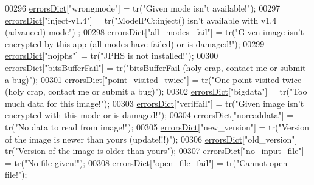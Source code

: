 \begin{DoxyCode}
00296     \hyperlink{class_view_p_c_aaf7f058e5589d65fec72a21abfd5629b}{errorsDict}[\textcolor{stringliteral}{"wrongmode"}] = tr(\textcolor{stringliteral}{"Given mode isn't available!"});
00297     \hyperlink{class_view_p_c_aaf7f058e5589d65fec72a21abfd5629b}{errorsDict}[\textcolor{stringliteral}{"inject-v1.4"}] = tr(\textcolor{stringliteral}{"ModelPC::inject() isn't available with v1.4 (advanced) mode"})
      ;
00298     \hyperlink{class_view_p_c_aaf7f058e5589d65fec72a21abfd5629b}{errorsDict}[\textcolor{stringliteral}{"all\_modes\_fail"}] = tr(\textcolor{stringliteral}{"Given image isn't encrypted by this app (all modes have
       failed) or is damaged!"});
00299     \hyperlink{class_view_p_c_aaf7f058e5589d65fec72a21abfd5629b}{errorsDict}[\textcolor{stringliteral}{"nojphs"}] = tr(\textcolor{stringliteral}{"JPHS is not installed!"});
00300     \hyperlink{class_view_p_c_aaf7f058e5589d65fec72a21abfd5629b}{errorsDict}[\textcolor{stringliteral}{"bitsBufferFail"}] = tr(\textcolor{stringliteral}{"bitsBufferFail (holy crap, contact me or submit a bug)"});
00301     \hyperlink{class_view_p_c_aaf7f058e5589d65fec72a21abfd5629b}{errorsDict}[\textcolor{stringliteral}{"point\_visited\_twice"}] = tr(\textcolor{stringliteral}{"One point visited twice (holy crap, contact me or
       submit a bug)"});
00302     \hyperlink{class_view_p_c_aaf7f058e5589d65fec72a21abfd5629b}{errorsDict}[\textcolor{stringliteral}{"bigdata"}] = tr(\textcolor{stringliteral}{"Too much data for this image!"});
00303     \hyperlink{class_view_p_c_aaf7f058e5589d65fec72a21abfd5629b}{errorsDict}[\textcolor{stringliteral}{"veriffail"}] = tr(\textcolor{stringliteral}{"Given image isn't encrypted with this mode or is damaged!"});
00304     \hyperlink{class_view_p_c_aaf7f058e5589d65fec72a21abfd5629b}{errorsDict}[\textcolor{stringliteral}{"noreaddata"}] = tr(\textcolor{stringliteral}{"No data to read from image!"});
00305     \hyperlink{class_view_p_c_aaf7f058e5589d65fec72a21abfd5629b}{errorsDict}[\textcolor{stringliteral}{"new\_version"}] = tr(\textcolor{stringliteral}{"Version of the image is newer than yours (update!!!)"});
00306     \hyperlink{class_view_p_c_aaf7f058e5589d65fec72a21abfd5629b}{errorsDict}[\textcolor{stringliteral}{"old\_version"}] = tr(\textcolor{stringliteral}{"Version of the image is older than yours"});
00307     \hyperlink{class_view_p_c_aaf7f058e5589d65fec72a21abfd5629b}{errorsDict}[\textcolor{stringliteral}{"no\_input\_file"}] = tr(\textcolor{stringliteral}{"No file given!"});
00308     \hyperlink{class_view_p_c_aaf7f058e5589d65fec72a21abfd5629b}{errorsDict}[\textcolor{stringliteral}{"open\_file\_fail"}] = tr(\textcolor{stringliteral}{"Cannot open file!"});

\end{DoxyCode}
